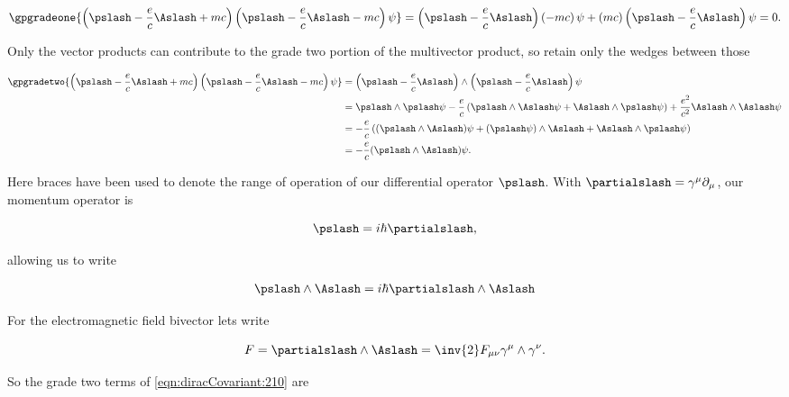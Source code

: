 \begin{equation}\label{eqn:diracCovariant:250}
\gpgradeone{
\left(\pslash - \frac{e}{c}\Aslash + m c \right) \left(\pslash - \frac{e}{c}\Aslash - m c \right) \psi
} 
=
\left(\pslash - \frac{e}{c}\Aslash \right) \left( - m c \right) \psi
+ \left( m c \right) \left(\pslash - \frac{e}{c}\Aslash \right) \psi
= 0.
\end{equation}

Only the vector products can contribute to the grade two portion of the multivector product, so retain only the wedges between those

\begin{align*}
\gpgradetwo{
\left(\pslash - \frac{e}{c}\Aslash + m c \right) \left(\pslash - \frac{e}{c}\Aslash - m c \right) \psi
}
&=
\left(\pslash - \frac{e}{c}\Aslash \right) \wedge \left(\pslash - \frac{e}{c}\Aslash \right) \psi \\
&=
\pslash \wedge \pslash \psi 
- \frac{e}{c} \left( \pslash \wedge \Aslash \psi + \Aslash \wedge \pslash \psi \right)
+ \frac{e^2}{c^2} \Aslash \wedge \Aslash \psi \\
&=
- \frac{e}{c} \left( (\pslash \wedge \Aslash) \psi + (\pslash \psi) \wedge \Aslash + \Aslash \wedge \pslash \psi \right) \\
&=
- \frac{e}{c} (\pslash \wedge \Aslash) \psi.
\end{align*}

Here braces have been used to denote the range of operation of our differential operator $\pslash$.  With $\partialslash = \gamma^\mu \partial_\mu$, our momentum operator is

\begin{equation}\label{eqn:diracCovariant:270}
\pslash = i \hbar \partialslash,
\end{equation}

allowing us to write 

\begin{align*}
\pslash \wedge \Aslash
&=
i \hbar \partialslash \wedge \Aslash \\
\end{align*}

For the electromagnetic field bivector lets write

\begin{equation}\label{eqn:diracCovariant:290}
F = \partialslash \wedge \Aslash = \inv{2} F_{\mu \nu} \gamma^\mu \wedge \gamma^\nu.
\end{equation}

So the grade two terms of \ref{eqn:diracCovariant:210} are

